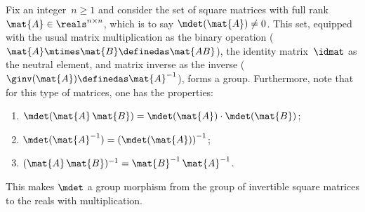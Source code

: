 \begin{example}
	\label{exa:square-full}
	Fix an integer~$n\geq1 $ and consider the set of square matrices with full rank~$\mat{A} \in \reals^{n\times n}$, which is to say $\mdet(\mat{A}) \neq 0$.
	This set, equipped with the usual matrix multiplication as the binary operation ($\mat{A}\mtimes \mat{B}\definedas \mat{AB}$), the identity matrix~$\idmat$ as the neutral element, and matrix inverse as the inverse ($\ginv(\mat{A})\definedas \mat{A}^{-1}$), forms a group.
	Furthermore, note that for this type of matrices, one has the properties:
	\begin{enumerate}
		\item $\mdet(\mat{A} \, \mat{B}) = \mdet(\mat{A}) \cdot  \mdet(\mat{B})$;
		\item $\mdet(\mat{A}^{-1}) = \left( \mdet(\mat{A}) \right) ^ {-1}$;
		\item $(\mat{A}\,\mat{B})^{-1} = {\mat{B}^{-1} \, \mat{A}^{-1}}$.
	\end{enumerate}
	This makes $\mdet$ a group morphism from the group of invertible square matrices to the reals with multiplication.
\end{example}